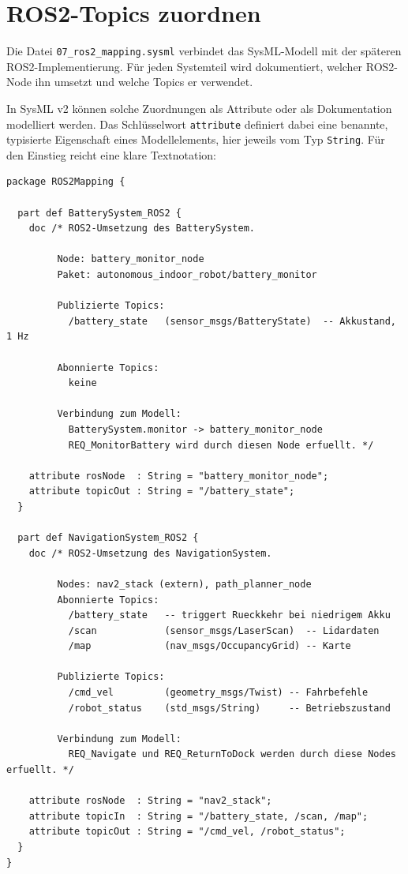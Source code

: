 \section{ROS2-Topics zuordnen}

Die Datei \texttt{07\_ros2\_mapping.sysml} verbindet das SysML-Modell mit der späteren ROS2-Implementierung. Für jeden Systemteil wird dokumentiert, welcher ROS2-Node ihn umsetzt und welche Topics er verwendet.

In SysML v2 können solche Zuordnungen als Attribute oder als Dokumentation modelliert werden. Das Schlüsselwort \texttt{attribute} definiert dabei eine benannte, typisierte Eigenschaft eines Modellelements, hier jeweils vom Typ \texttt{String}. Für den Einstieg reicht eine klare Textnotation:

\begin{lstlisting}
package ROS2Mapping {

  part def BatterySystem_ROS2 {
    doc /* ROS2-Umsetzung des BatterySystem.

         Node: battery_monitor_node
         Paket: autonomous_indoor_robot/battery_monitor

         Publizierte Topics:
           /battery_state   (sensor_msgs/BatteryState)  -- Akkustand, 1 Hz

         Abonnierte Topics:
           keine

         Verbindung zum Modell:
           BatterySystem.monitor -> battery_monitor_node
           REQ_MonitorBattery wird durch diesen Node erfuellt. */

    attribute rosNode  : String = "battery_monitor_node";
    attribute topicOut : String = "/battery_state";
  }

  part def NavigationSystem_ROS2 {
    doc /* ROS2-Umsetzung des NavigationSystem.

         Nodes: nav2_stack (extern), path_planner_node
         Abonnierte Topics:
           /battery_state   -- triggert Rueckkehr bei niedrigem Akku
           /scan            (sensor_msgs/LaserScan)  -- Lidardaten
           /map             (nav_msgs/OccupancyGrid) -- Karte

         Publizierte Topics:
           /cmd_vel         (geometry_msgs/Twist) -- Fahrbefehle
           /robot_status    (std_msgs/String)     -- Betriebszustand

         Verbindung zum Modell:
           REQ_Navigate und REQ_ReturnToDock werden durch diese Nodes erfuellt. */

    attribute rosNode  : String = "nav2_stack";
    attribute topicIn  : String = "/battery_state, /scan, /map";
    attribute topicOut : String = "/cmd_vel, /robot_status";
  }
}
\end{lstlisting}

